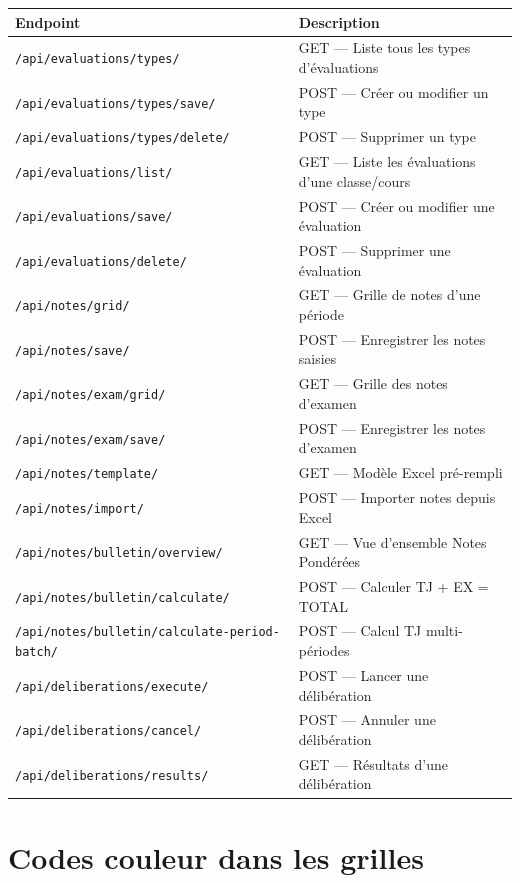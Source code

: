 {\small
\begin{tabularx}{\textwidth}{lX}
\toprule
\textbf{Endpoint} & \textbf{Description} \\
\midrule
\texttt{/api/evaluations/types/} & GET --- Liste tous les types d'\'evaluations \\
\texttt{/api/evaluations/types/save/} & POST --- Cr\'eer ou modifier un type \\
\texttt{/api/evaluations/types/delete/} & POST --- Supprimer un type \\
\texttt{/api/evaluations/list/} & GET --- Liste les \'evaluations d'une classe/cours \\
\texttt{/api/evaluations/save/} & POST --- Cr\'eer ou modifier une \'evaluation \\
\texttt{/api/evaluations/delete/} & POST --- Supprimer une \'evaluation \\
\texttt{/api/notes/grid/} & GET --- Grille de notes d'une p\'eriode \\
\texttt{/api/notes/save/} & POST --- Enregistrer les notes saisies \\
\texttt{/api/notes/exam/grid/} & GET --- Grille des notes d'examen \\
\texttt{/api/notes/exam/save/} & POST --- Enregistrer les notes d'examen \\
\texttt{/api/notes/template/} & GET --- Mod\`ele Excel pr\'e-rempli \\
\texttt{/api/notes/import/} & POST --- Importer notes depuis Excel \\
\texttt{/api/notes/bulletin/overview/} & GET --- Vue d'ensemble Notes Pond\'er\'ees \\
\texttt{/api/notes/bulletin/calculate/} & POST --- Calculer TJ + EX = TOTAL \\
\texttt{/api/notes/bulletin/calculate-period-batch/} & POST --- Calcul TJ multi-p\'eriodes \\
\texttt{/api/deliberations/execute/} & POST --- Lancer une d\'elib\'eration \\
\texttt{/api/deliberations/cancel/} & POST --- Annuler une d\'elib\'eration \\
\texttt{/api/deliberations/results/} & GET --- R\'esultats d'une d\'elib\'eration \\
\bottomrule
\end{tabularx}
}

\section{Codes couleur dans les grilles}


